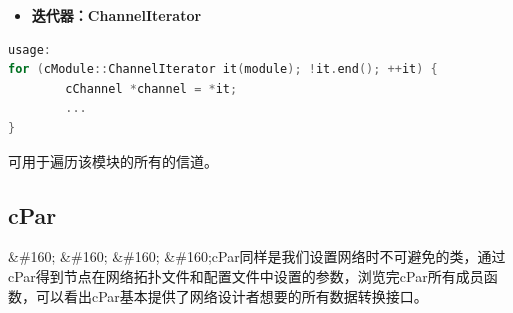 \begin{itemize}
\item \textbf{迭代器：ChannelIterator}

\end{itemize}

\begin{lstlisting}[language=c]
usage:
for (cModule::ChannelIterator it(module); !it.end(); ++it) {
        cChannel *channel = *it;
        ...
}
\end{lstlisting}

可用于遍历该模块的所有的信道。

\subsection{cPar}
\label{cpar}

\&\#160; \&\#160; \&\#160; \&\#160;cPar同样是我们设置网络时不可避免的类，通过cPar得到节点在网络拓扑文件和配置文件中设置的参数，浏览完cPar所有成员函数，可以看出cPar基本提供了网络设计者想要的所有数据转换接口。

